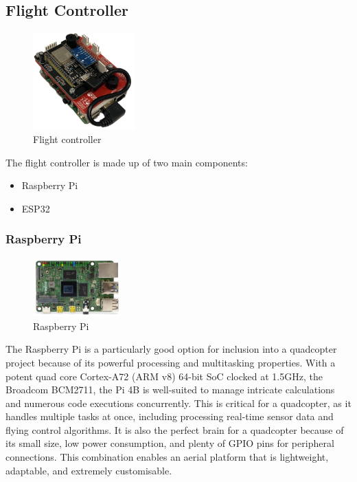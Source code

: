 \documentclass{article}
\begin{document}
\subsection{Flight Controller}\label{flight_controller}
\begin{figure}[H]
  \centering
  \includegraphics[width=0.35\textwidth]{Pictures/flight_controller.png}
  \caption{Flight controller}
  \label{fig:flightController}
\end{figure}
The flight controller is made up of two main components:
\begin{itemize}
  \item Raspberry Pi
  \item ESP32
\end{itemize}
\subsubsection{Raspberry Pi}
\begin{figure}[H]
  \centering
  \includegraphics[width=0.3\textwidth]{Pictures/raspberry_pi.png}
  \caption{Raspberry Pi}
  \label{fig:rasberry_pi}  
\end{figure}
The Raspberry Pi is a particularly good option for inclusion into a quadcopter project because of its powerful processing and multitasking properties. With a potent quad core Cortex-A72 (ARM v8) 64-bit SoC clocked at 1.5GHz, the Broadcom BCM2711, the Pi 4B is well-suited to manage intricate calculations and numerous code executions concurrently. This is critical for a quadcopter, 
as it handles multiple tasks at once, including processing real-time sensor data and flying control algorithms. It is also the perfect brain for a quadcopter because of its small size, low power consumption, and plenty of GPIO pins for peripheral connections. This combination enables an aerial platform that is lightweight, adaptable, and extremely customisable.
\end{document}
